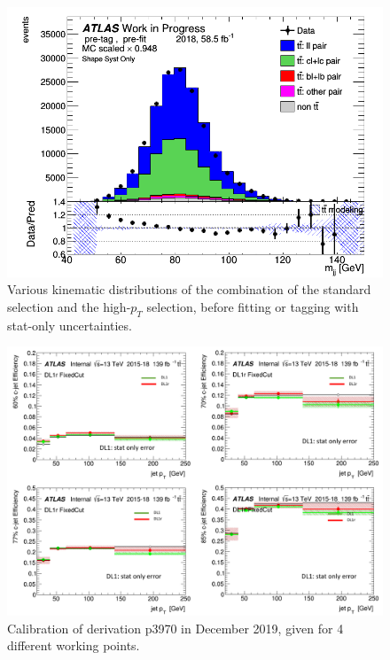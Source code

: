 \documentclass[letterpaper,12pt]{article}
\begin{document}
\begin{figure}[H]
\begin{minipage}[b]{.45\textwidth}
\includegraphics[width=1\textwidth]{Distribution_March_highpT/DataMC_mjj.png}
\end{minipage}
\caption{Various kinematic distributions of the combination of the 
standard selection and the high-$p_T$ selection, before fitting or 
tagging with stat-only uncertainties.} \label{fig:highpT_selection}
\end{figure}



\begin{figure}
\includegraphics[width=1\textwidth]{Dec_eff.png}
\caption{Calibration of derivation p3970 in December 2019, given for  4 different working points.}\label{fig:Dec_eff}
\end{figure}
\end{document}
